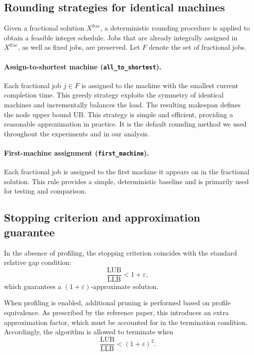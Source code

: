 \subsection{Rounding strategies for identical machines}
\label{subsec:identical-rounding}

Given a fractional solution \(X^{\text{frac}}\), a deterministic rounding procedure is applied to obtain a feasible integer schedule.
Jobs that are already integrally assigned in \(X^{\text{frac}}\), as well as fixed jobs, are preserved.
Let \(F\) denote the set of fractional jobs.

\paragraph{Assign-to-shortest machine (\texttt{all\_to\_shortest}).}
Each fractional job \(j \in F\) is assigned to the machine with the smallest current completion time.
This greedy strategy exploits the symmetry of identical machines and incrementally balances the load.
The resulting makespan defines the node upper bound \(\text{UB}\).
This strategy is simple and efficient, providing a reasonable approximation in practice.
It is the default rounding method we used throughout the experiments and in our analysis.

\paragraph{First-machine assignment (\texttt{first\_machine}).}
Each fractional job is assigned to the first machine it appears on in the fractional solution.
This rule provides a simple, deterministic baseline and is primarily used for testing and comparison.

\subsection{Stopping criterion and approximation guarantee}
\label{subsec:identical-stopping}

In the absence of profiling, the stopping criterion coincides with the standard relative gap condition:
\[
  \frac{\text{LUB}}{\text{LLB}} < 1 + \varepsilon,
\]
which guarantees a \((1+\varepsilon)\)-approximate solution.

When profiling is enabled, additional pruning is performed based on profile equivalence.
As prescribed by the reference paper, this introduces an extra approximation factor, which must be accounted for in the termination condition.
Accordingly, the algorithm is allowed to terminate when
\[
  \frac{\text{LUB}}{\text{LLB}} < (1 + \varepsilon)^2.
\]

